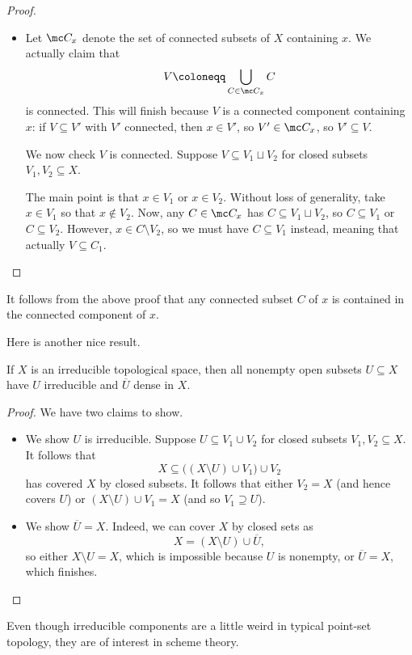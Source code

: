 \documentclass[../notes.tex]{subfiles}
\begin{document}
\begin{proof}
\begin{listalph}
\begin{itemize}
			\item Let $\mc C_x$ denote the set of connected subsets of $X$ containing $x$. We actually claim that
			\[V\coloneqq\bigcup_{C\in\mc C_x}C\]
			is connected. This will finish because $V$ is a connected component containing $x$: if $V\subseteq V'$ with $V'$ connected, then $x\in V'$, so $V'\in\mc C_x$, so $V'\subseteq V$.
			
			We now check $V$ is connected. Suppose $V\subseteq V_1\sqcup V_2$ for closed subsets $V_1,V_2\subseteq X$.

			The main point is that $x\in V_1$ or $x\in V_2$. Without loss of generality, take $x\in V_1$ so that $x\notin V_2$. Now, any $C\in\mc C_x$ has $C\subseteq V_1\sqcup V_2$, so $C\subseteq V_1$ or $C\subseteq V_2$. However, $x\in C\setminus V_2$, so we must have $C\subseteq V_1$ instead, meaning that actually $V\subseteq C_1$.
			\qedhere
		\end{itemize}
	\end{listalph}
\end{proof}
\begin{remark}
	It follows from the above proof that any connected subset $C$ of $x$ is contained in the connected component of $x$.
\end{remark}
Here is another nice result.
\begin{proposition} \label{prop:opensinirredspace}
	If $X$ is an irreducible topological space, then all nonempty open subsets $U\subseteq X$ have $U$ irreducible and $\overline U$ dense in $X$.
\end{proposition}
\begin{proof}
	We have two claims to show.
	\begin{itemize}
		\item We show $U$ is irreducible. Suppose $U\subseteq V_1\cup V_2$ for closed subsets $V_1,V_2\subseteq X$. It follows that
		\[X\subseteq\big((X\setminus U)\cup V_1\big)\cup V_2\]
		has covered $X$ by closed subsets. It follows that either $V_2=X$ (and hence covers $U$) or $(X\setminus U)\cup V_1=X$ (and so $V_1\supseteq U$).
		\item We show $\overline U=X$. Indeed, we can cover $X$ by closed sets as
		\[X=(X\setminus U)\cup\overline U,\]
		so either $X\setminus U=X$, which is impossible because $U$ is nonempty, or $\overline U=X$, which finishes.
		\qedhere
	\end{itemize}
\end{proof}
Even though irreducible components are a little weird in typical point-set topology, they are of interest in scheme theory.
\end{document}
